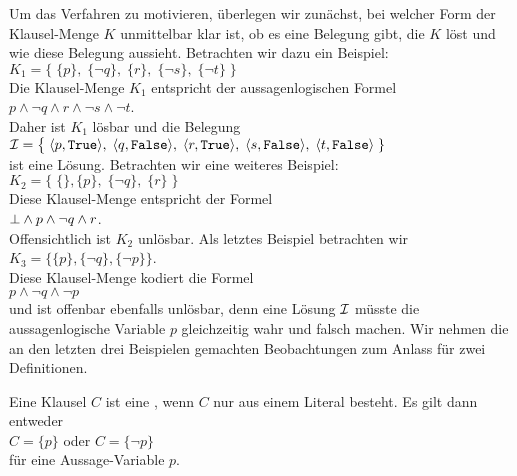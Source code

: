 Um das Verfahren zu motivieren, überlegen wir zunächst, bei welcher Form der Klausel-Menge $K$
unmittelbar klar ist, ob es eine Belegung gibt, die $K$ löst und wie diese Belegung
aussieht.  Betrachten wir dazu ein Beispiel: \\[0.2cm]
\hspace*{1.3cm} 
$K_1 = \bigl\{\; \{p\},\; \{\neg q\},\; \{r\},\; \{\neg s\}, \; \{\neg t\} \;\bigr\}$ 
\\[0.2cm]
Die Klausel-Menge $K_1$ entspricht der aussagenlogischen Formel
\\[0.2cm]
\hspace*{1.3cm}
$p \wedge \neg q \wedge r \wedge \neg s \wedge \neg t$.
\\[0.2cm]
Daher ist $K_1$ lösbar und die Belegung  \\[0.2cm]
\hspace*{1.3cm} 
$\I = \bigl\{\; \pair(p, \texttt{True}),\; \pair(q, \texttt{False}),\;\pair(r, \texttt{True}),\; \pair(s, \texttt{False}),\; \pair(t, \texttt{False})\;\}$
\\[0.2cm]
ist eine Lösung.  Betrachten wir eine weiteres Beispiel: \\[0.2cm]
\hspace*{1.3cm} 
$K_2 = \bigl\{\; \{\}, \{p\},\; \{\neg q\},\; \{r\}\; \bigr\}$ 
\\[0.2cm]
Diese Klausel-Menge entspricht der Formel
\\[0.2cm]
\hspace*{1.3cm}
$\bot \wedge p \wedge \neg q \wedge r$.
\\[0.2cm]
Offensichtlich ist $K_2$ unlösbar.  Als letztes Beispiel betrachten wir 
\\[0.2cm]
\hspace*{1.3cm} $K_3 = \bigl\{ \{p\}, \{\neg q\}, \{\neg p\} \bigr\}$.
\\[0.2cm]
Diese Klausel-Menge kodiert die Formel
\\[0.2cm]
\hspace*{1.3cm}
$p \wedge \neg q \wedge \neg p $
\\[0.2cm]
und ist offenbar  ebenfalls unlösbar, denn eine Lösung $\mathcal{I}$ müsste die aussagenlogische Variable $p$ gleichzeitig
wahr und falsch machen.  Wir nehmen die an den letzten drei Beispielen gemachten Beobachtungen zum Anlass für zwei Definitionen.

\begin{Definition}
  Eine Klausel $C$ ist eine , wenn $C$ nur aus einem Literal besteht.
  Es gilt dann entweder
  \\[0.2cm]
  \hspace*{1.3cm}
  $C = \{p\}$ \quad oder \quad $C = \{\neg p\}$ 
  \\[0.2cm]
  für eine Aussage-Variable $p$. \eox
\end{Definition}

